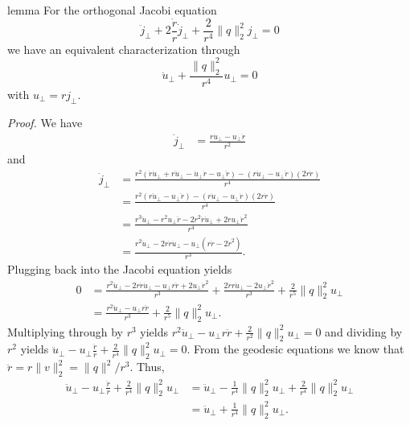 \documentclass{article}
\begin{document}
\begin{restatable}{lemma}{} \label{lemma: orthog jacobi equation}
    For the orthogonal Jacobi equation
    \begin{equation}
        \ddot j_{\perp} +  2\frac{\dot r}{r}\dot j_{\perp} + \frac{2}{r^4}\|q\|_2^2j_{\perp} = 0
    \end{equation}
    we have an equivalent characterization through
    \begin{equation}
        \ddot u_{\perp} + \frac{\|q\|_2^2}{r^4}u_\perp = 0
    \end{equation}
    with $u_\perp = rj_{\perp}$.
\end{restatable}
\noindent \textit{Proof.} We have
\begin{align}
    \dot j_{\perp} &= \frac{r\dot u_{\perp} - u_\perp \dot r}{r^2}
\end{align}
and 
\begin{align}
    \ddot j_{\perp} &= \frac{r^2(\dot r\dot u_{\perp} + r \ddot u_{\perp} - \dot u_\perp \dot r - u_\perp \ddot r) - (r\dot u_{\perp} - u_\perp \dot r)(2r\dot r)}{r^4} \\
    &= \frac{r^2(r \ddot u_{\perp} - u_\perp \ddot r) - (r\dot u_{\perp} - u_\perp \dot r)(2r\dot r)}{r^4} \\
    &= \frac{r^3 \ddot u_{\perp} - r^2u_\perp \ddot r - 2r^2\dot r\dot u_{\perp} + 2ru_\perp \dot r^2}{r^4} \\
    &= \frac{r^2 \ddot u_{\perp} - 2r\dot r\dot u_{\perp}- u_\perp\left(r \ddot r - 2 \dot r^2\right)}{r^3}.
\end{align}
Plugging back into the Jacobi equation yields
\begin{align}
    0 &= \frac{r^2 \ddot u_{\perp} - 2r\dot r\dot u_{\perp}- u_\perp r\ddot r + 2 u_{\perp}\dot r^2}{r^3} + \frac{2\dot rr\dot u_{\perp} - 2u_\perp \dot r^2}{r^3} + \frac{2}{r^5}\|q\|_2^2u_{\perp} \\
    &= \frac{r^2 \ddot u_{\perp} - u_\perp r\ddot r}{r^3} + \frac{2}{r^5}\|q\|_2^2u_{\perp}.
\end{align}
Multiplying through by $r^3$ yields $r^2 \ddot u_{\perp} - u_\perp r\ddot r + \frac{2}{r^2}\|q\|_2^2u_{\perp} = 0$ and dividing by $r^2$ yields $\ddot u_{\perp} - u_\perp \frac{\ddot r}{r} + \frac{2}{r^4}\|q\|_2^2u_{\perp} = 0$. From the geodesic equations we know that $\ddot r = r\|v\|_2^2 = \|q\|^2/r^3$. Thus,
\begin{align}
    \ddot u_{\perp} - u_\perp \frac{\ddot r}{r} + \frac{2}{r^4}\|q\|_2^2u_{\perp} &= \ddot u_{\perp} -  \frac{1}{r^4}\|q\|_2^2u_\perp + \frac{2}{r^4}\|q\|_2^2u_{\perp} \\
    &= \ddot u_{\perp} + \frac{1}{r^4}\|q\|_2^2u_\perp.
\end{align}
\end{document}
